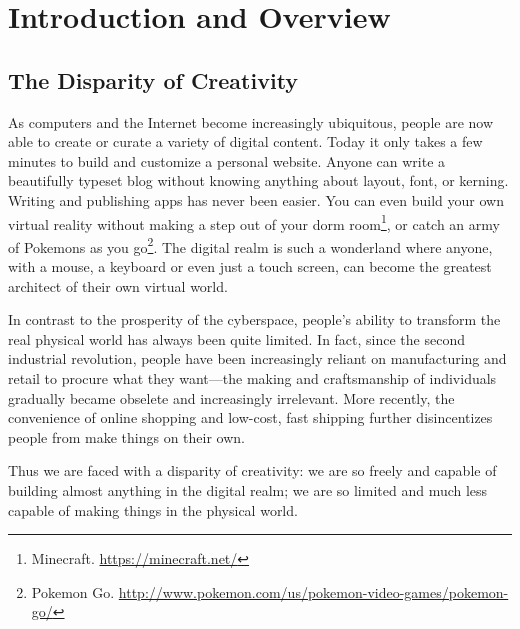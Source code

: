 \chapter{Introduction and Overview}

\section{The Disparity of Creativity}
As computers and the Internet become increasingly ubiquitous, people are now able to create or curate a variety of digital content. Today it only takes a few minutes to build and customize a personal website. Anyone can write a beautifully typeset blog without knowing anything about layout, font, or kerning. Writing and publishing apps has never been easier. You can even build your own virtual reality without making a step out of your dorm room\footnote{Minecraft. \url{https://minecraft.net/}}, or catch an army of Pokemons as you go\footnote{Pokemon Go. \url{http://www.pokemon.com/us/pokemon-video-games/pokemon-go/}}. The digital realm is such a wonderland where anyone, with a mouse, a keyboard or even just a touch screen, can become the greatest architect of their own virtual world.

In contrast to the prosperity of the cyberspace, people's ability to transform the real physical world has always been quite limited. In fact, since the second industrial revolution, people have been increasingly reliant on manufacturing and retail to procure what they want---the making and craftsmanship of individuals gradually became obselete and increasingly irrelevant. More recently, the convenience of online shopping and low-cost, fast shipping further disincentizes people from make things on their own.

Thus we are faced with a disparity of creativity: we are so freely and capable of building almost anything in the digital realm; we are so limited and much less capable of making things in the physical world.

